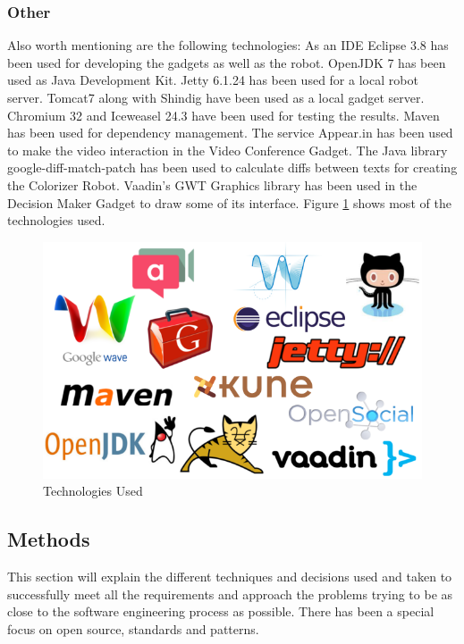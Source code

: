 \subsubsection{Other}
Also worth mentioning are the following technologies:
As an IDE Eclipse \cite{ref:eclipse} 3.8 has been used for developing the gadgets as well as the robot. OpenJDK \cite{ref:openjdk} 7 has been used as Java Development Kit. Jetty \cite{ref:jetty} 6.1.24 has been used for a local robot server. Tomcat7 \cite{ref:tomcat} along with Shindig have been used as a local gadget server. Chromium \cite{ref:chromium} 32 and Iceweasel \cite{ref:iceweasel} 24.3 have been used for testing the results. Maven \cite{ref:maven} has been used for dependency management. The service Appear.in has been used to make the video interaction in the Video Conference Gadget. The Java library google-diff-match-patch has been used to calculate diffs between texts for creating the Colorizer Robot. Vaadin's GWT Graphics library has been used in the Decision Maker Gadget to draw some of its interface. Figure \ref{fig:logos} shows most of the technologies used.
\begin{figure}[h]
  \center
    \includegraphics[keepaspectratio, scale=0.45]{Media/logos.png}
  \caption{Technologies Used}
  \label{fig:logos}
\end{figure}

\subsection{Methods}
This section will explain the different techniques and decisions used and taken to successfully meet all the requirements and approach the problems trying to be as close to the software engineering process as possible. There has been a special focus on open source, standards and patterns.
